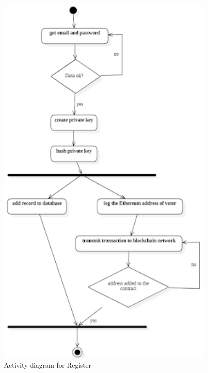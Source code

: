 \begin{figure}[H] %
\begin{center}
	\includegraphics[width = 4.3in]{images/activityDiagramForRegister.png}
	\caption{Activity diagram for Register} %
	\label{figSample1} %
\end{center}
\end{figure}

